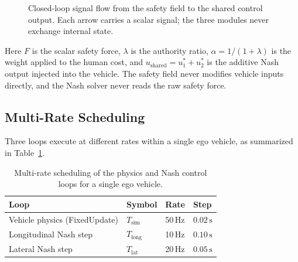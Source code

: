\documentclass[12pt,a4paper,oneside]{report}
\begin{document}
\begin{figure}[H]
\centering
{}
\caption{Closed-loop signal flow from the safety field to the shared control output. Each arrow carries a scalar signal; the three modules never exchange internal state.}
\label{fig:signal_flow}
\end{figure}

Here $F$ is the scalar safety force, $\lambda$ is the authority ratio, $\alpha = 1/(1+\lambda)$ is the weight applied to the human cost, and $u_{\mathrm{shared}} = u_1^{*} + u_2^{*}$ is the additive Nash output injected into the vehicle. The safety field never modifies vehicle inputs directly, and the Nash solver never reads the raw safety force.

\subsection{Multi-Rate Scheduling}
\label{sec:nash_scheduling}

Three loops execute at different rates within a single ego vehicle, as summarized in Table~\ref{tab:multi_rate}.

\begin{table}[H]
\centering
\caption{Multi-rate scheduling of the physics and Nash control loops for a single ego vehicle.}
\label{tab:multi_rate}
\begin{tabular}{llll}
\hline
\textbf{Loop} & \textbf{Symbol} & \textbf{Rate} & \textbf{Step} \\
\hline
Vehicle physics (FixedUpdate) & $T_{\mathrm{sim}}$  & 50\,Hz & $0.02\,\mathrm{s}$ \\
Longitudinal Nash step         & $T_{\mathrm{long}}$ & 10\,Hz & $0.10\,\mathrm{s}$ \\
Lateral Nash step              & $T_{\mathrm{lat}}$  & 20\,Hz & $0.05\,\mathrm{s}$ \\
\hline
\end{tabular}
\end{table}
\end{document}

